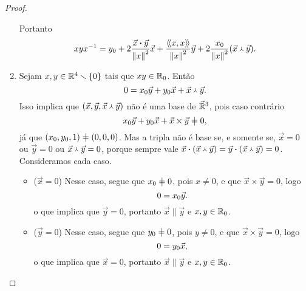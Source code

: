 \begin{proof}
\begin{enumerate}
Portanto
		\begin{equation*}
		xyx^{-1} = {y}_0 + 2\frac{{\vec{x}} \bm{\cdot} {\vec{y}}}{\left\Vert{x}\right\Vert^2}\vec{x} + \frac{\left\langle\!\left\langle{x},{x}\right\rangle\!\right\rangle}{\left\Vert{x}\right\Vert^2}\vec{y} + 2\frac{{x}_0}{\left\Vert{x}\right\Vert^2}({\vec{x}} \Yup {\vec{y}}).
		\end{equation*}

	\item Sejam $x,y \in \mathbb{R}^4 \smallsetminus \{0\}$ tais que $xy \in {\mathbb{R}}_0$. Então
		\begin{equation*}
		0 = {x}_0\vec{y}+{y}_0\vec{x}+{\vec{x}} \Yup {\vec{y}}.
		\end{equation*}
	Isso implica que $(\vec{x},\vec{y},{\vec{x}} \Yup {\vec{y}})$ não é uma base de $\vec{\mathbb{R}}^3$, pois caso contrário
		\begin{equation*}
		\esc{x}\vec{y}+\esc{y}\vec{x}+\vec{x} \times \vec{y} \neq 0,
		\end{equation*}
	já que $(\esc{x},\esc{y},1) \neq (0,0,0)$. Mas a tripla não é base se, e somente se, $\vec{x}=0$ ou $\vec{y}=0$ ou ${\vec{x}} \Yup {\vec{y}}=0$, porque sempre vale ${\vec{x}} \bm{\cdot} {({\vec{x}} \Yup {\vec{y}})} = {\vec{y}} \bm{\cdot} {({\vec{x}} \Yup {\vec{y}})}=0$. Consideramos cada caso.
		\begin{itemize}
		\item ($\vec{x}=0$) Nesse caso, segue que $\esc{x} \neq 0$, pois $x \neq 0$, e que $\vec{x} \times \vec{y}=0$, logo
			\begin{equation*}
			0 = {x}_0\vec{y}.
			\end{equation*}
		o que implica que $\vec{y}=0$, portanto $\vec{x} \parallel \vec{y}$ e $x,y \in {\mathbb{R}}_0$.

		\item ($\vec{y}=0$) Nesse caso, segue que $\esc{y} \neq 0$, pois $y \neq 0$, e que $\vec{x} \times \vec{y}=0$, logo
			\begin{equation*}
			0 = {y}_0\vec{x},
			\end{equation*}
		o que implica que $\vec{x}=0$, portanto $\vec{x} \parallel \vec{y}$ e $x,y \in {\mathbb{R}}_0$.


\end{itemize}
\end{enumerate}
\end{proof}
